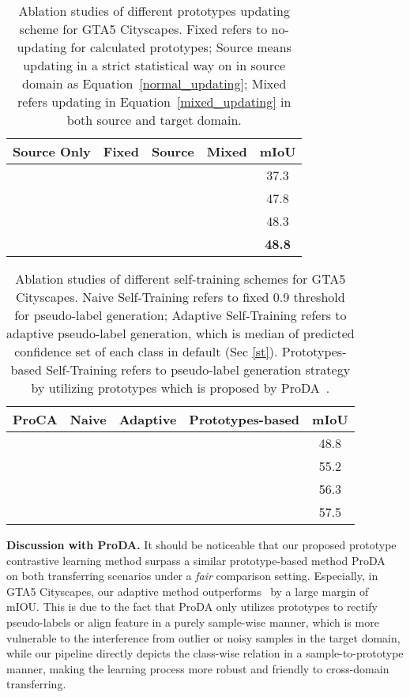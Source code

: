 \documentclass[runningheads]{llncs}
\newcommand{\cmark}{\ding{51}}\newcommand{\xmark}{\ding{55}}\newcommand{\myparagraph}[1]{\medbreak\noindent\textbf{#1}}
\begin{document}
\begin{table}[t!]
\caption{Ablation studies of different prototypes updating scheme for GTA5  Cityscapes. Fixed refers to no-updating for calculated prototypes; Source means updating in a strict statistical way on in source domain as Equation~\ref{normal_updating}; Mixed refers updating in Equation~\ref{mixed_updating} in both source and target domain. }
    \centering
    \begin{tabular}{c c c c c }
    \toprule
         Source Only &  Fixed  & Source & Mixed & mIoU  \\
         \hline
         \cmark & &  &  & 37.3 \\
         \cmark & \cmark & & & 47.8 \\
         \cmark &  & \cmark & & 48.3 \\
         \cmark &  &  & \cmark & \textbf{48.8} \\
         \bottomrule
    \end{tabular}
\label{updating_method}
\end{table}

\begin{table}[t!]
\caption{Ablation studies of different self-training schemes for GTA5  Cityscapes. Naive Self-Training refers to fixed 0.9 threshold for pseudo-label generation; Adaptive Self-Training refers to adaptive pseudo-label generation, which is median of predicted confidence set of each class in default (Sec \ref{st}). Prototypes-based Self-Training refers to pseudo-label generation strategy by utilizing prototypes which is proposed by ProDA~\cite{zhang2021prototypical}.
}
    \centering
    \begin{tabular}{ccccc}
    \toprule
         ProCA & Naive & Adaptive & Prototypes-based & mIoU  \\
         \hline
         \cmark & &  &  & 48.8 \\
         \cmark & \cmark & & & 55.2 \\
         \cmark &  & \cmark & & 56.3 \\
         \cmark &  &  & \cmark & 57.5 \\
         \bottomrule
    \end{tabular}
\label{different_st_method}
\end{table}

\noindent \textbf{Discussion with ProDA.}
It should be noticeable that our proposed prototype contrastive learning method surpass a similar prototype-based method ProDA~\cite{zhang2021prototypical} on both transferring scenarios under a \emph{fair} comparison setting. Especially, in GTA5  Cityscapes, our adaptive method outperforms~\cite{zhang2021prototypical} by a large margin of  mIOU. This is due to the fact that ProDA only utilizes prototypes to rectify pseudo-labels or align feature in a purely sample-wise manner, which is more vulnerable to the interference from outlier or noisy samples in the target domain, while our pipeline directly depicts the class-wise relation in a sample-to-prototype manner, making the learning process more robust and friendly to cross-domain transferring.  
\end{document}
